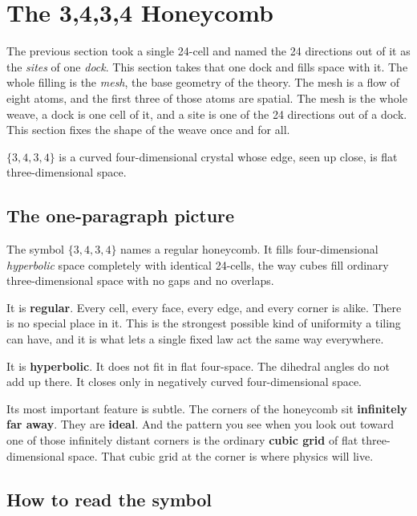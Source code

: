 \section{The {3,4,3,4} Honeycomb}

The previous section took a single 24-cell and named the 24 directions out of it as the \emph{sites} of one \emph{dock}. This section takes that one dock and fills space with it. The whole filling is the \emph{mesh}, the base geometry of the theory. The mesh is a flow of eight atoms, and the first three of those atoms are spatial. The mesh is the whole weave, a dock is one cell of it, and a site is one of the 24 directions out of a dock. This section fixes the shape of the weave once and for all.

\begin{principle}
$\{3,4,3,4\}$ is a curved four-dimensional crystal whose edge, seen up close, is flat three-dimensional space.
\end{principle}

\subsection{The one-paragraph picture}

The symbol $\{3,4,3,4\}$ names a regular honeycomb. It fills four-dimensional \emph{hyperbolic} space completely with identical 24-cells, the way cubes fill ordinary three-dimensional space with no gaps and no overlaps.

It is \textbf{regular}. Every cell, every face, every edge, and every corner is alike. There is no special place in it. This is the strongest possible kind of uniformity a tiling can have, and it is what lets a single fixed law act the same way everywhere.

It is \textbf{hyperbolic}. It does not fit in flat four-space. The dihedral angles do not add up there. It closes only in negatively curved four-dimensional space.

Its most important feature is subtle. The corners of the honeycomb sit \textbf{infinitely far away}. They are \textbf{ideal}. And the pattern you see when you look out toward one of those infinitely distant corners is the ordinary \textbf{cubic grid} of flat three-dimensional space. That cubic grid at the corner is where physics will live.

\subsection{How to read the symbol}

